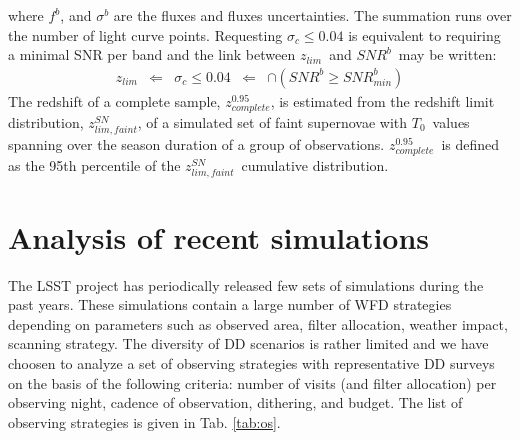 \documentclass[skiphelvet,twocolumn]{aastex63}
\newcommand{\snrb}{\mbox{$SNR^b$}}
\newcommand{\snrbmin}{\mbox{$SNR^b_{min}$}}
\newcommand{\daymax}{$T_0$}
\newcommand{\sigc}{\mbox{$\sigma_c$}}
\newcommand{\zlim}{\mbox{$z_{lim}$}}
\newcommand{\zlimfaint}{\mbox{$z_{lim,faint}^{SN}$}}
\newcommand{\zcompb}{\mbox{$z_{complete}^{0.95}$}}
\begin{document}
where $f^b$, and $\sigma^b$ are the fluxes and fluxes uncertainties. The summation runs over the number of light curve points. Requesting \sigc$\leq 0.04$ is equivalent to requiring a minimal SNR per band and the link between \zlim~and \snrb~may be written:
\begin{equation}
  \begin{aligned}
    \zlim &\Longleftarrow & \sigc \leq 0.04 & \Longleftarrow &\cap (\snrb \geq \snrbmin)
    \end{aligned}
 \label{eq:zlimsnr}
\end{equation}
The redshift of a complete sample, \zcompb, is estimated from the redshift limit distribution, \zlimfaint, of a simulated set of faint supernovae with \daymax~values spanning over the season duration of a group of observations. \zcompb~is defined as the 95th percentile of the \zlimfaint~cumulative distribution.


\section{Analysis of recent simulations}
\label{sec:analysis}
The LSST project has periodically released few sets of simulations during the past years. These simulations contain a large number of WFD strategies depending on parameters such as observed area, filter allocation, weather impact, scanning strategy. The diversity of DD scenarios is rather limited and we have choosen to analyze a set of observing strategies with representative DD surveys on the basis of the following criteria: number of visits (and filter allocation) per observing night, cadence of observation, dithering, and budget. The list of observing strategies is given in Tab. \ref{tab:os}.
\end{document}
